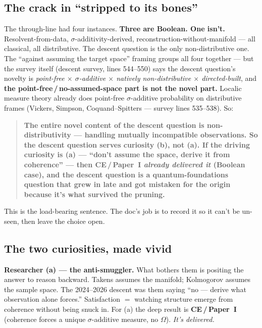 \documentclass[11pt]{article}
\begin{document}
\subsection{The crack in ``stripped to its bones''}

The through-line had four instances. \textbf{Three are Boolean. One isn't.}
Resolvent-from-data, $\sigma$-additivity-derived, reconstruction-without-manifold
--- all classical, all distributive. The descent question is the only
non-distributive one. The ``against assuming the target space'' framing groups
all four together --- but the survey itself (descent survey, lines 544--550) says
the descent question's novelty is \emph{point-free $\times$ $\sigma$-additive
$\times$ natively non-distributive $\times$ directed-built}, and \textbf{the
point-free\,/\,no-assumed-space part is not the novel part.} Localic measure
theory already does point-free $\sigma$-additive probability on distributive
frames (Vickers, Simpson, Coquand--Spitters --- survey lines 535--538). So:

\begin{quote}
\textbf{The entire novel content of the descent question is non-distributivity
--- handling mutually incompatible observations. So the descent question serves
curiosity (b), not (a). If the driving curiosity is (a) --- ``don't assume the
space, derive it from coherence'' --- then CE\,/\,Paper~I \emph{already delivered
it} (Boolean case), and the descent question is a quantum-foundations question
that grew in late and got mistaken for the origin because it's what survived the
pruning.}
\end{quote}

This is the load-bearing sentence. The doc's job is to record it so it can't be
un-seen, then leave the choice open.

\subsection{The two curiosities, made vivid}

\noindent
\textbf{Researcher (a) --- the anti-smuggler.} What bothers them is positing the
answer to reason backward. Takens assumes the manifold; Kolmogorov assumes the
sample space. The 2024--2026 descent was them saying ``no --- derive what
observation alone forces.'' Satisfaction $=$ watching structure emerge from
coherence without being snuck in. For (a) the deep result is \textbf{CE\,/\,Paper~I}
(coherence forces a unique $\sigma$-additive measure, no $\Omega$).
\emph{It's delivered.}
\end{document}
